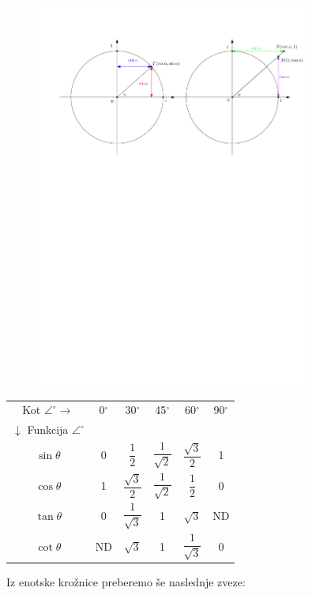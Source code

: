 \documentclass{article}
\begin{document}
\begin{figure}[H]
\includegraphics[width=0.8\textwidth]{trigonometrija.enotska.pdf}
\centering
\end{figure}

\begin{tabular*}{\linewidth}[b]{*{6}{|c @{\extracolsep\fill}}|}
\hline  Kot $\angle^\circ \rightarrow$   &0$^\circ$& 30$^\circ$ & 45$^\circ$ & 60$^\circ$ & 90$^\circ$
\\ $\downarrow$ Funkcija $\angle ^\circ$ &  &  &  &  & \\ 
\hline $\sin \theta$ & 0 & $\dfrac{1}{2}$ &$\dfrac{1}{\sqrt{2}}$ & $\dfrac{\sqrt{3}}{2}$& 1\\[15pt]
\hline $\cos \theta$ & 1 & $\dfrac{\sqrt{3}}{2}$ &$\dfrac{1}{\sqrt{2}}$ & $\dfrac{1}{2}$& 0\\ 
\hline $\tan \theta$ & 0 & $\dfrac{{1}}{\sqrt{3}}$ &1  & $\sqrt{3}$ & ND\\
\hline
$\cot \theta$ & ND & $\sqrt{3}$ &1 & $\dfrac{{1}}{\sqrt{3}}$ & 0 \\ \hline
\end{tabular*}


Iz enotske krožnice preberemo še naslednje zveze:
\end{document}
